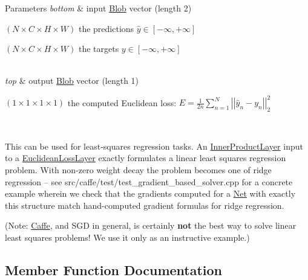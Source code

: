 \begin{DoxyParams}{Parameters}
{\em bottom} & input \mbox{\hyperlink{classcaffe_1_1_blob}{Blob}} vector (length 2)
\begin{DoxyEnumerate}
\item $ (N \times C \times H \times W) $ the predictions $ \hat{y} \in [-\infty, +\infty]$
\item $ (N \times C \times H \times W) $ the targets $ y \in [-\infty, +\infty]$ 
\end{DoxyEnumerate}\\
\hline
{\em top} & output \mbox{\hyperlink{classcaffe_1_1_blob}{Blob}} vector (length 1)
\begin{DoxyEnumerate}
\item $ (1 \times 1 \times 1 \times 1) $ the computed Euclidean loss\+: $ E = \frac{1}{2n} \sum\limits_{n=1}^N \left| \left| \hat{y}_n - y_n \right| \right|_2^2 $
\end{DoxyEnumerate}\\
\hline
\end{DoxyParams}
This can be used for least-\/squares regression tasks. An \mbox{\hyperlink{classcaffe_1_1_inner_product_layer}{Inner\+Product\+Layer}} input to a \mbox{\hyperlink{classcaffe_1_1_euclidean_loss_layer}{Euclidean\+Loss\+Layer}} exactly formulates a linear least squares regression problem. With non-\/zero weight decay the problem becomes one of ridge regression -- see src/caffe/test/test\+\_\+gradient\+\_\+based\+\_\+solver.\+cpp for a concrete example wherein we check that the gradients computed for a \mbox{\hyperlink{classcaffe_1_1_net}{Net}} with exactly this structure match hand-\/computed gradient formulas for ridge regression.

(Note\+: \mbox{\hyperlink{classcaffe_1_1_caffe}{Caffe}}, and S\+GD in general, is certainly {\bfseries not} the best way to solve linear least squares problems! We use it only as an instructive example.) 

\subsection{Member Function Documentation}
\mbox{\label{classcaffe_1_1_euclidean_loss_layer_a76dd3fde9f09cb9840f05ee035b5a2c5}} 
